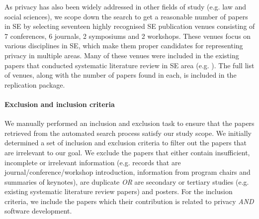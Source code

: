 As privacy has also been widely addressed in other fields of study (e.g. law and social sciences), we scope down the search to get a reasonable number of papers in SE by selecting seventeen highly recognised SE publication venues consisting of 7 conferences, 6 journals, 2 symposiums and 2 workshops. These venues focus on various disciplines in SE, which make them proper candidates for representing privacy in multiple areas. Many of these venues were included in the existing papers that conducted systematic literature review in SE area (e.g. \cite{Ebrahimi2019, Perera2020a, Bertolino2018}). The full list of venues, along with the number of papers found in each, is included in the replication package. %

\paragraph{\textbf{Exclusion and inclusion criteria}}

We manually performed an inclusion and exclusion task to ensure that the papers retrieved from the automated search process satisfy our study scope. We initially determined a set of inclusion and exclusion criteria to filter out the papers that are irrelevant to our goal. We exclude the papers that either contain insufficient, incomplete or irrelevant information (e.g. records that are journal/conference/workshop introduction, information from program chairs and summaries of keynotes), are duplicate \emph{OR} are secondary or tertiary studies (e.g. existing systematic literature review papers) and posters. For the inclusion criteria, we include the papers which their contribution is related to privacy \emph{AND} software development.




